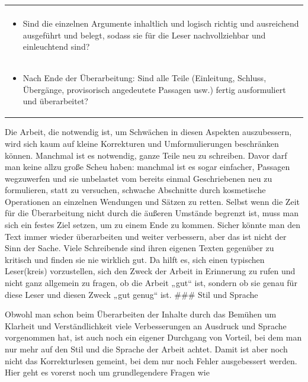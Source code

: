\documentclass[]{book}
\providecommand{\tightlist}{%
  \setlength{\itemsep}{0pt}\setlength{\parskip}{0pt}}
\theoremstyle{definition}
\theoremstyle{definition}
\theoremstyle{definition}
\theoremstyle{remark}
\begin{document}
\begin{longtable}[]{@{}l@{}}
\begin{minipage}[t]{0.97\columnwidth}
\end{minipage}\tabularnewline
\begin{minipage}[t]{0.97\columnwidth}\raggedright\strut
\begin{itemize}
\tightlist
\item
  Sind die einzelnen Argumente inhaltlich und logisch richtig und
  ausreichend ausgeführt und belegt, sodass sie für die Leser
  nachvollziehbar und einleuchtend sind? \vspace{-6mm}
\end{itemize}\strut
\end{minipage}\tabularnewline
\begin{minipage}[t]{0.97\columnwidth}\raggedright\strut
\begin{itemize}
\tightlist
\item
  Nach Ende der Überarbeitung: Sind alle Teile (Einleitung, Schluss,
  Übergänge, provisorisch angedeutete Passagen usw.) fertig
  ausformuliert und überarbeitet?
\end{itemize}\strut
\end{minipage}\tabularnewline
\bottomrule
\end{longtable}

Die Arbeit, die notwendig ist, um Schwächen in diesen Aspekten
auszubessern, wird sich kaum auf kleine Korrekturen und Umformulierungen
beschränken können. Manchmal ist es notwendig, ganze Teile neu zu
schreiben. Davor darf man keine allzu große Scheu haben: manchmal ist es
sogar einfacher, Passagen wegzuwerfen und sie unbelastet vom bereits
einmal Geschriebenen neu zu formulieren, statt zu versuchen, schwache
Abschnitte durch kosmetische Operationen an einzelnen Wendungen und
Sätzen zu retten. Selbst wenn die Zeit für die Überarbeitung nicht durch
die äußeren Umstände begrenzt ist, muss man sich ein festes Ziel setzen,
um zu einem Ende zu kommen. Sicher könnte man den Text immer wieder
überarbeiten und weiter verbessern, aber das ist nicht der Sinn der
Sache. Viele Schreibende sind ihren eigenen Texten gegenüber zu kritisch
und finden sie nie wirklich gut. Da hilft es, sich einen typischen
Leser(kreis) vorzustellen, sich den Zweck der Arbeit in Erinnerung zu
rufen und nicht ganz allgemein zu fragen, ob die Arbeit „gut`` ist,
sondern ob sie genau für diese Leser und diesen Zweck „gut genug`` ist.
\#\#\# Stil und Sprache

Obwohl man schon beim Überarbeiten der Inhalte durch das Bemühen um
Klarheit und Verständlichkeit viele Verbesserungen an Ausdruck und
Sprache vorgenommen hat, ist auch noch ein eigener Durchgang von
Vorteil, bei dem man nur mehr auf den Stil und die Sprache der Arbeit
achtet. Damit ist aber noch nicht das Korrekturlesen gemeint, bei dem
nur noch Fehler ausgebessert werden. Hier geht es vorerst noch um
grundlegendere Fragen wie
\end{document}
